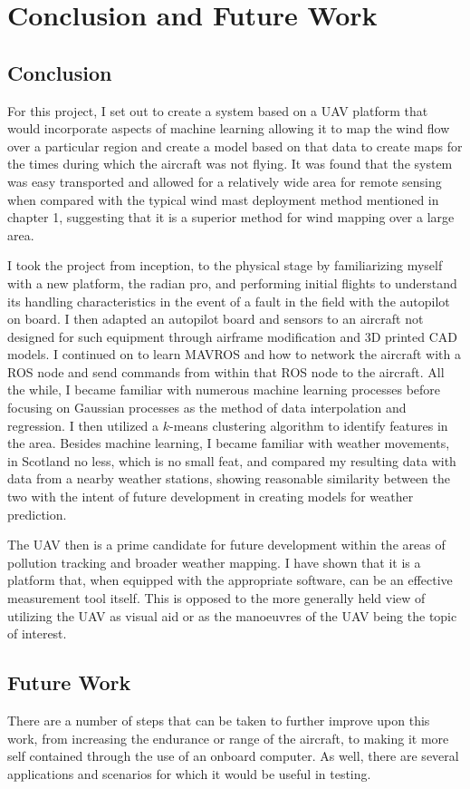 \documentclass[12pt]{report}
\begin{document}
\chapter{Conclusion and Future Work}
\section{Conclusion}
For this project, I set out to create a system based on a UAV platform that would incorporate aspects of machine learning allowing it to map the wind flow over a particular region and create a model based on that data to create maps for the times during which the aircraft was not flying. It was found that the system was easy transported and allowed for a relatively wide area for remote sensing when compared with the typical wind mast deployment method mentioned in chapter 1, suggesting that it is a superior method for wind mapping over a large area.  

I took the project from inception, to the physical stage by familiarizing myself with a new platform, the radian pro, and performing initial flights to understand its handling characteristics in the event of a fault in the field with the autopilot on board. I then adapted an autopilot board and sensors to an aircraft not designed for such equipment through airframe modification and 3D printed CAD models. I continued on to learn MAVROS and how to network the aircraft with a ROS node and send commands from within that ROS node to the aircraft. All the while, I became familiar with numerous machine learning processes before focusing on Gaussian processes as the method of data interpolation and regression. I then utilized a $k$-means clustering algorithm to identify features in the area. Besides machine learning, I became familiar with weather movements, in Scotland no less, which is no small feat, and compared my resulting data with data from a nearby weather stations, showing reasonable similarity between the two with the intent of future development in creating models for weather prediction.

The UAV then is a prime candidate for future development within the areas of pollution tracking and broader weather mapping. I have shown that it is a platform that, when equipped with the appropriate software, can be an effective measurement tool itself. This is opposed to the more generally held view of utilizing the UAV as visual aid or as the manoeuvres of the UAV being the topic of interest.

\section{Future Work}
There are a number of steps that can be taken to further improve upon this work, from increasing the endurance or range of the aircraft, to making it more self contained through the use of an onboard computer. As well, there are several applications and scenarios for which it would be useful in testing.
\end{document}
